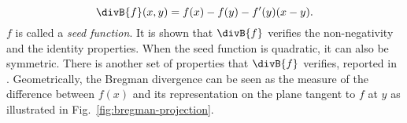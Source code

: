 \iflatexml\else {} \fi
\begin{equation}
\divB{f}(x,y) = f(x)-f(y)-f'(y)(x-y).
\label{eq:bregman-div}
\end{equation} 
$f$ is called a \emph{seed function}.
It is shown that $\divB{f}$ verifies the non-negativity and the identity properties. When the seed function is quadratic, it can also be symmetric. 
There is another set of properties that $\divB{f}$ verifies, reported in \cite{bregman_relaxation_1967}.
Geometrically, the Bregman divergence can be seen as the measure of the difference between $f(x)$ and its representation on the plane tangent to $f$ at $y$ as illustrated in Fig.~\ref{fig:bregman-projection}.

